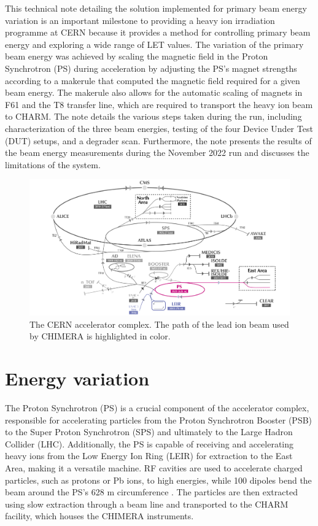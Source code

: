 \documentclass{cernatsnote}
\begin{document}
This technical note detailing the solution implemented for primary beam energy variation is an important milestone to providing a heavy ion irradiation programme at CERN because it provides a method for controlling primary beam energy and exploring a wide range of LET values. The variation of the primary beam energy was achieved by scaling the magnetic field in the Proton Synchrotron (PS) during acceleration by adjusting the PS's magnet strengths according to a makerule that computed the magnetic field required for a given beam energy. The makerule also allows for the automatic scaling of magnets in F61 and the T8 transfer line, which are required to transport the heavy ion beam to CHARM. The note details the various steps taken during the run, including characterization of the three beam energies, testing of the four Device Under Test (DUT) setups, and a degrader scan. Furthermore, the note presents the results of the beam energy measurements during the November 2022 run and discusses the limitations of the system.

\begin{figure}[!htb]
\centering
\includegraphics[width=1.0\textwidth]{images/CCC_eastt8_small.png}
\caption{The CERN accelerator complex. The path of the lead ion beam used by CHIMERA is highlighted in color.}
\label{fig:CCC}
\end{figure}


\section{Energy variation}

The Proton Synchrotron (PS) is a crucial component of the accelerator complex, responsible for accelerating particles from the Proton Synchrotron Booster (PSB) to the Super Proton Synchrotron (SPS) and ultimately to the Large Hadron Collider (LHC). Additionally, the PS is capable of receiving and accelerating heavy ions from the Low Energy Ion Ring (LEIR) for extraction to the East Area, making it a versatile machine. RF cavities are used to accelerate charged particles, such as protons or Pb ions, to high energies, while 100 dipoles bend the beam around the PS's 628 m circumference \cite{gilardoni_fifty_2011}. The particles are then extracted using slow extraction through a beam line and transported to the CHARM facility, which houses the CHIMERA instruments.
\\
\end{document}
